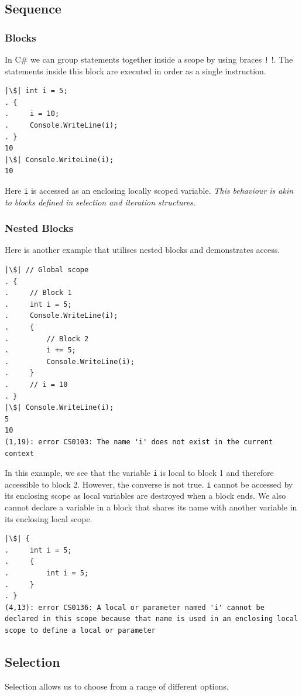 \documentclass{article}
\begin{document}
\subsection{Sequence}
\subsubsection{Blocks}
In C\# we can group statements together inside a scope by using braces
\texttt!{ }!. The statements inside this block are executed
in order as a single instruction.
\begin{verbatim}
|\$| int i = 5;
. {
.     i = 10;
.     Console.WriteLine(i);
. }
10
|\$| Console.WriteLine(i);
10
\end{verbatim}
Here \texttt{i} is accessed as an enclosing locally scoped
variable. \emph{This behaviour is akin to blocks defined in selection
and iteration structures.}
\subsubsection{Nested Blocks}
Here is another example that utilises nested blocks and demonstrates
access.
\begin{verbatim}
|\$| // Global scope
. {
.     // Block 1
.     int i = 5;
.     Console.WriteLine(i);
.     {
.         // Block 2
.         i += 5;
.         Console.WriteLine(i);
.     }
.     // i = 10
. }
|\$| Console.WriteLine(i);
5
10
(1,19): error CS0103: The name 'i' does not exist in the current context
\end{verbatim}
In this example, we see that the variable \texttt{i} is
local to block 1 and therefore accessible to block 2. However, the
converse is not true. \texttt{i} cannot be accessed by its
enclosing scope as local variables are destroyed when a block ends. We
also cannot declare a variable in a block that shares its name with
another variable in its enclosing local scope.
\begin{verbatim}
|\$| {
.     int i = 5;
.     {
.         int i = 5;
.     }
. }
(4,13): error CS0136: A local or parameter named 'i' cannot be declared in this scope because that name is used in an enclosing local scope to define a local or parameter
\end{verbatim}
\subsection{Selection}
Selection allows us to choose from a range of different options.
\end{document}

